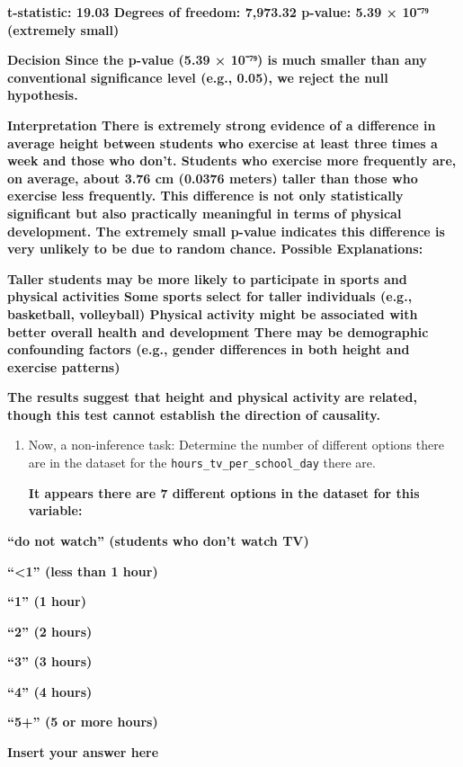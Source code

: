 \documentclass[
]{article}
\begin{document}
\textbf{t-statistic: 19.03 Degrees of freedom: 7,973.32 p-value: 5.39 ×
10⁻⁷⁹ (extremely small)}

\textbf{Decision Since the p-value (5.39 × 10⁻⁷⁹) is much smaller than
any conventional significance level (e.g., 0.05), we reject the null
hypothesis.}

\textbf{Interpretation There is extremely strong evidence of a
difference in average height between students who exercise at least
three times a week and those who don't. Students who exercise more
frequently are, on average, about 3.76 cm (0.0376 meters) taller than
those who exercise less frequently. This difference is not only
statistically significant but also practically meaningful in terms of
physical development. The extremely small p-value indicates this
difference is very unlikely to be due to random chance. Possible
Explanations:}

\textbf{Taller students may be more likely to participate in sports and
physical activities Some sports select for taller individuals (e.g.,
basketball, volleyball) Physical activity might be associated with
better overall health and development There may be demographic
confounding factors (e.g., gender differences in both height and
exercise patterns)}

\textbf{The results suggest that height and physical activity}
\textbf{are related, though this test cannot establish the direction of
causality.}

\begin{enumerate}
\def\labelenumi{\arabic{enumi}.}
\setcounter{enumi}{10}
\item
  Now, a non-inference task: Determine the number of different options
  there are in the dataset for the \texttt{hours\_tv\_per\_school\_day}
  there are.

  \textbf{It appears there are 7 different options in the dataset for
  this variable:}
\end{enumerate}

\textbf{``do not watch'' (students who don't watch TV)}

\textbf{``\textless1'' (less than 1 hour)}

\textbf{``1'' (1 hour)}

\textbf{``2'' (2 hours)}

\textbf{``3'' (3 hours)}

\textbf{``4'' (4 hours)}

\textbf{``5+'' (5 or more hours)}

\textbf{Insert your answer here}
\end{document}

